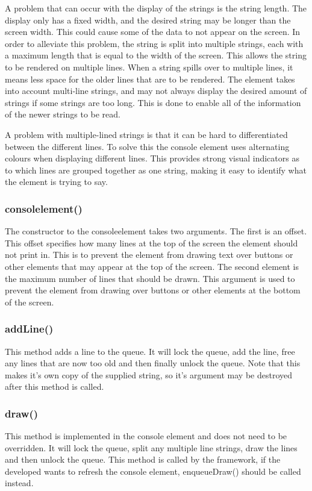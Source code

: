 A problem that can occur with the display of the strings is the string length. The display only has a fixed width, and the desired string may be longer than the screen width. This could cause some of the data to not appear on the screen. In order to alleviate this problem, the string is split into multiple strings, each with a maximum length that is equal to the width of the screen. This allows the string to be rendered on multiple lines. When a string spills over to multiple lines, it means less space for the older lines that are to be rendered. The element takes into account multi-line strings, and may not always display the desired amount of strings if some strings are too long. This is done to enable all of the information of the newer strings to be read.

A problem with multiple-lined strings is that it can be hard to differentiated between the different lines. To solve this the console element uses alternating colours when displaying different lines. This provides strong visual indicators as to which lines are grouped together as one string, making it easy to identify what the element is trying to say.

\subsubsection{consolelement()}

The constructor to the consoleelement takes two arguments. The first is an offset. This offset specifies how many lines at the top of the screen the element should not print in. This is to prevent the element from drawing text over buttons or other elements that may appear at the top of the screen. The second element is the maximum number of lines that should be drawn. This argument is used to prevent the element from drawing over buttons or other elements at the bottom of the screen.

\subsubsection{addLine()}

This method adds a line to the queue. It will lock the queue, add the line, free any lines that are now too old and then finally unlock the queue. Note that this makes it's own copy of the supplied string, so it's argument may be destroyed after this method is called.

\subsubsection{draw()}

This method is implemented in the console element and does not need to be overridden. It will lock the queue, split any multiple line strings, draw the lines and then unlock the queue. This method is called by the framework, if the developed wants to refresh the console element, enqueueDraw() should be called instead.

